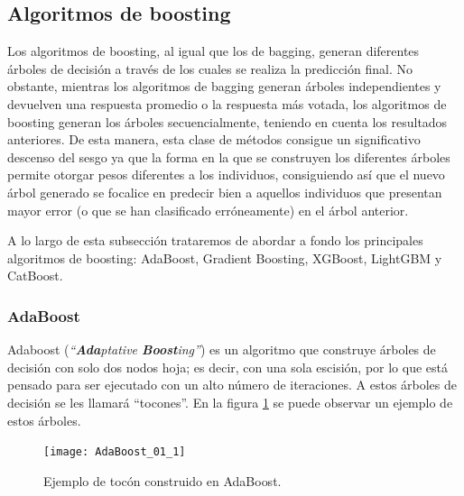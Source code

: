 \documentclass[12pt,twoside]{article}
\begin{document}
\subsection{Algoritmos de boosting}
Los algoritmos de boosting, al igual que los de bagging, generan diferentes árboles de decisión a través de los cuales se realiza la predicción final. No obstante, mientras los algoritmos de bagging generan árboles independientes y devuelven una respuesta promedio o la respuesta más votada, los algoritmos de boosting generan los árboles secuencialmente, teniendo en cuenta los resultados anteriores. De esta manera, esta clase de métodos consigue un significativo descenso del sesgo ya que la forma en la que se construyen los diferentes árboles permite otorgar pesos diferentes a los individuos, consiguiendo así que el nuevo árbol generado se focalice en predecir bien a aquellos individuos que presentan mayor error (o que se han clasificado erróneamente) en el árbol anterior.

A lo largo de esta subsección trataremos de abordar a fondo los principales algoritmos de boosting: AdaBoost, Gradient Boosting, XGBoost, LightGBM y CatBoost.


\subsubsection{AdaBoost} \label{sec:AdaBoost}
Adaboost (\textit{``\textbf{Ada}ptative \textbf{Boost}ing''}) \cite{FR01} es un algoritmo que construye árboles de decisión con solo dos nodos hoja; es decir, con una sola escisión, por lo que está pensado para ser ejecutado con un alto número de iteraciones. A estos árboles de decisión se les llamará ``tocones''. En la figura \ref{fig: AdaBoost_01} se puede observar un ejemplo de estos árboles.
\begin{figure}[h]
\centering
\texttt{[image: AdaBoost\_01\_1]}
\caption{Ejemplo de tocón construido en AdaBoost.}
\label{fig: AdaBoost_01}
\end{figure}
\end{document}
